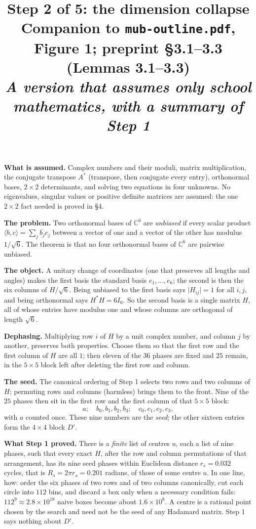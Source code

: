 \documentclass[11pt]{article}
\title{\bfseries Step 2 of 5: the dimension collapse\\[5pt]
\large\normalfont Companion to \texttt{mub-outline.pdf}, Figure 1; preprint \S3.1--3.3 (Lemmas 3.1--3.3)\\[3pt]
\normalsize\itshape A version that assumes only school mathematics, with a summary of Step 1}
\author{}
\date{}
\newcommand{\C}{\mathbb{C}}
\newcommand{\inner}[2]{\langle #1,#2\rangle}
\newcommand{\abs}[1]{\lvert #1\rvert}
\begin{document}
\maketitle
\vspace{-2.4em}

\noindent\textbf{What is assumed.} Complex numbers and their moduli, matrix multiplication, the
conjugate transpose $A^*$ (transpose, then conjugate every entry), orthonormal bases, $2\times2$
determinants, and solving two equations in four unknowns. No eigenvalues, singular values or positive
definite matrices are assumed: the one $2\times2$ fact needed is proved in \S4.

\begin{recap}
\small
\textbf{The problem.} Two orthonormal bases of $\C^6$ are \emph{unbiased} if every scalar product
$\inner{b}{c}=\sum_j\overline{b_j}c_j$ between a vector of one and a vector of the other has modulus
$1/\sqrt6$. The theorem is that no four
orthonormal bases of $\C^6$ are pairwise unbiased.

\textbf{The object.} A unitary change of coordinates (one that preserves all lengths and angles) makes
the first basis the standard basis
$e_1,\dots,e_6$; the second is then the six columns of $H/\sqrt6$. Being unbiased to the first basis
says $\abs{H_{ij}}=1$ for all $i,j$, and being orthonormal says $H^*H=6I_6$. So the second basis is a
single matrix $H$, all of whose entries have modulus one and whose columns are orthogonal of length
$\sqrt6$.

\textbf{Dephasing.} Multiplying row $i$ of $H$ by a unit complex number, and column $j$ by another,
preserves both properties. Choose them so that the first row and the first column of $H$ are all $1$;
then eleven of the $36$ phases are fixed and $25$ remain, in the $5\times5$ block left after deleting
the first row and column.

\textbf{The seed.} The canonical ordering of Step 1 selects two rows and two columns of $H$; permuting
rows and columns (harmless) brings them to the front. Nine of the $25$ phases then sit in the first row
and the first column of that $5\times5$ block:
\[
a;\quad b_0,b_1,b_2,b_3;\quad c_0,c_1,c_2,c_3 ,
\]
with $a$ counted once. These nine numbers are the \emph{seed}; the other sixteen entries form the
$4\times4$ block $D'$.

\textbf{What Step 1 proved.} There is a \emph{finite} list of centres $u$, each a list of nine phases, such that every exact $H$,
after the row and column permutations of that arrangement, has its nine seed phases within Euclidean
distance $r_s=0.032$ cycles, that is $R_s=2\pi r_s=0.201$ radians, of those of some centre $u$. In one line, how: order
the six phases of two rows and of two columns canonically, cut each circle into $112$ bins, and
discard a box only when a necessary condition fails: $112^9\approx2.8\times10^{18}$ naive boxes become
about $1.6\times10^8$. A centre is a rational point chosen by the search and need not be the seed of any Hadamard matrix.
Step 1 says nothing about $D'$.


\end{recap}
\end{document}
